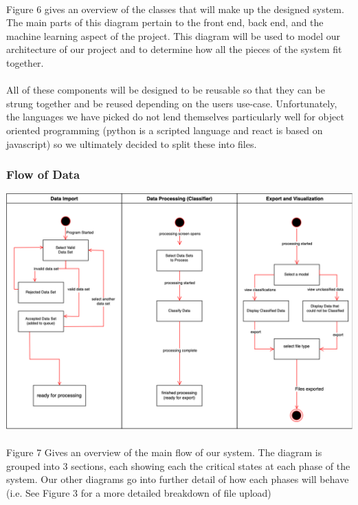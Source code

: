 \documentclass[12pt,oneside,letterpaper]{article}
\begin{document}
\paragraph{}Figure 6 gives an overview of the classes that will make up the designed system. The main parts of this diagram pertain to the front end, back end, and the machine learning aspect of the project. This diagram will be used to model our architecture of our project and to determine how all the pieces of the system fit together. 
 \paragraph{} All of these components will be designed to be reusable so that they can be strung together and be reused depending on the users use-case. Unfortunately, the languages we have picked do not lend themselves particularly well for object oriented programming (python is a scripted language and react is based on javascript) so we ultimately decided to split these into files.
 
 \subsubsection{Flow of Data}
\includegraphics[scale = 0.40]{LandonStateDiagram.png}
\begingroup
{}
\endgroup

\paragraph{}Figure 7 Gives an overview of the main flow of our system. The diagram is grouped into 3 sections, each showing each the critical states at each phase of the system. Our other diagrams go into further detail of how each phases will behave (i.e. See Figure 3 for a more detailed breakdown of file upload)
\end{document}
